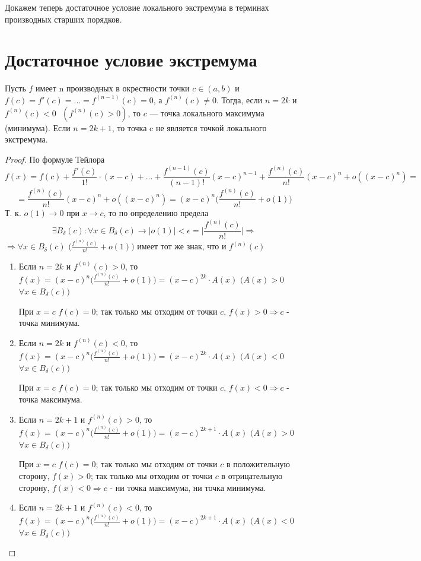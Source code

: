 	Докажем теперь достаточное условие локального экстремума в терминах производных старших порядков.
	
	\section{Достаточное условие экстремума}

	
	\begin{theorem}
		Пусть $f$ имеет n производных в окрестности точки $c \in (a, b)$ и $f(c) = f'(c) = ... = f^{(n - 1)}(c) = 0$, а $f^{(n)}(c) \neq 0$. Тогда, если $n = 2k$ и $f^{(n)}(c) < 0 \text{ } (f^{(n)}(c) > 0)$, то $c$ — точка локального максимума (минимума). Если $n = 2k + 1$, то точка c не является точкой локального экстремума.
	\end{theorem}
	
	\begin{proof}
		По формуле Тейлора
		\[ f(x) = f(c) + \frac{f'(c)}{1!} \cdot (x - c) + ... + \frac{f^{(n - 1)}(c)}{(n - 1)!}(x - c)^{n - 1} + \frac{f^{(n)}(c)}{n!}(x - c)^n + o((x - c)^n) = \]
		\[ = \frac{f^{(n)}(c)}{n!}(x - c)^n + o((x - c)^n) = (x - c)^n \bigg(\frac{f^{(n)}(c)}{n!} + o(1)\bigg) \]
		Т. к. $o(1) \to 0$ при $x \to c$, то по определению предела
		\[ \exists B_{\delta}(c): \forall x \in B_{\delta}(c) \rightarrow |o(1)| < \epsilon = \bigg|\frac{f^{(n)}{(c)}}{n!}\bigg| \Rightarrow \]
		$\Rightarrow \forall x \in B_{\delta}(c)$ $\big(\frac{f^{(n)}(c)}{n!} + o(1)\big)$ имеет тот же знак, что и $f^{(n)}(c)$
		\begin{enumerate}
			\item Если $n = 2k$ и $f^{(n)}(c) > 0$, то $f(x) = (x - c)^n \big(\frac{f^{(n)}(c)}{n!} + o(1)\big) = (x - c)^{2k} \cdot A(x)$ $(A(x) > 0$ $\forall x \in B_{\delta}(c))$
			
			При $x = c$ $f(c) = 0$; так только мы отходим от точки $c$, $f(x) > 0 \Rightarrow c$ - точка минимума.
			\item Если $n = 2k$ и $f^{(n)}(c) < 0$, то $f(x) = (x - c)^n \big(\frac{f^{(n)}(c)}{n!} + o(1)\big) = (x - c)^{2k} \cdot A(x)$ $(A(x) < 0$ $\forall x \in B_{\delta}(c))$
			
			При $x = c$ $f(c) = 0$; так только мы отходим от точки $c$, $f(x) < 0 \Rightarrow c$ - точка максимума.
			\item Если $n = 2k + 1$ и $f^{(n)}(c) > 0$, то $f(x) = (x - c)^n \big(\frac{f^{(n)}(c)}{n!} + o(1)\big) = (x - c)^{2k + 1} \cdot A(x)$ $(A(x) > 0$ $\forall x \in B_{\delta}(c))$
			
			При $x = c$ $f(c) = 0$; так только мы отходим от точки $c$ в положительную сторону, $f(x) > 0$; так только мы отходим от точки $c$ в отрицательную сторону, $f(x) < 0 \Rightarrow c$ - ни точка максимума, ни точка минимума.
			\item Если $n = 2k + 1$ и $f^{(n)}(c) < 0$, то $f(x) = (x - c)^n \big(\frac{f^{(n)}(c)}{n!} + o(1)\big) = (x - c)^{2k + 1} \cdot A(x)$ $(A(x) < 0$ $\forall x \in B_{\delta}(c))$
			

\end{enumerate}
\end{proof}
